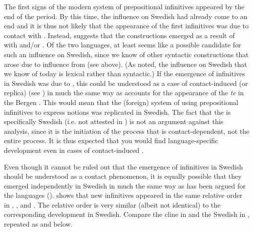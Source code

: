 \documentclass[output=paper]{langscibook}
\begin{document}
The first signs of the modern system of prepositional  infinitives appeared by the end of the  period. By this time, the  influence on Swedish had already come to an end and it is thus not likely that the appearance of the first  infinitives was due to contact with . Instead, \citet{Holm1967} suggests that the constructions emerged as a result of  with  and/or . Of the two languages, at least  seems like a possible candidate for such an influence on Swedish, since we know of other syntactic constructions that arose due to influence from  (see  above). (As noted, the  influence on Swedish that we know of today is lexical rather than syntactic.) If the emergence of  infinitives in Swedish was due to , this could be understood as a case of contact-induced (or replica)  (see \citealt{HeineKuteva2003, HeineKuteva2005}) in much the same way as \citet{Nesse2002} accounts for the appearance of the  \textit{te} in the  Bergen . This would mean that the (foreign) system of using prepositional infinitives to express  notions was replicated in Swedish. The fact that the  is specifically Swedish (i.e. not attested in ) is not an argument against this analysis, since it is the initiation of the  process that is contact-dependent, not the entire process. It is thus expected that you would find language-specific development even in cases of contact-induced . 



Even though it cannot be ruled out that the emergence of  infinitives in Swedish should be understood as a contact phenomenon, it is equally possible that they emerged independently in Swedish in much the same way as has been argued for the  languages (\citealt{Schulte2007Prepositional, Schulte2007What}). \citet{Schulte2007Prepositional, Schulte2007What} shows that new  infinitives appeared in the same relative order in , , and . The relative order is very similar (albeit not identical) to the corresponding development in Swedish. Compare the  cline in  and the Swedish in , repeated as  and  below. 
\end{document}
